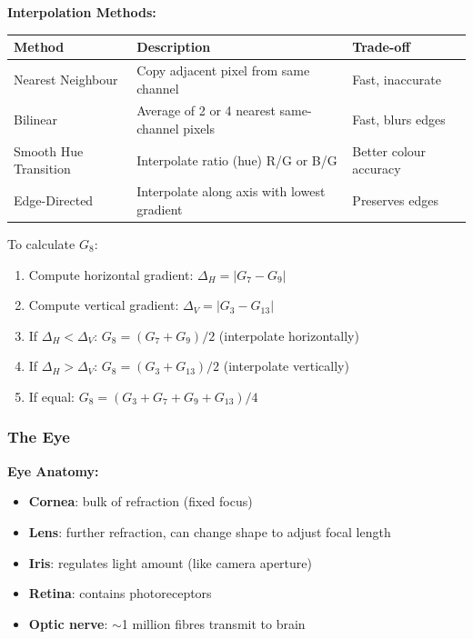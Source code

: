 \textbf{Interpolation Methods:}

\begin{center}
\renewcommand{\arraystretch}{1.3}
\begin{tabular}{@{} l p{5cm} p{4cm} @{}}
\toprule
\textbf{Method} & \textbf{Description} & \textbf{Trade-off} \\
\midrule
Nearest Neighbour & Copy adjacent pixel from same channel & Fast, inaccurate \\
Bilinear & Average of 2 or 4 nearest same-channel pixels & Fast, blurs edges \\
Smooth Hue Transition & Interpolate ratio (hue) R/G or B/G & Better colour accuracy \\
Edge-Directed & Interpolate along axis with lowest gradient & Preserves edges \\
\bottomrule
\end{tabular}
\end{center}

\begin{exbox}
To calculate $G_8$:
\begin{enumerate}
  \item Compute horizontal gradient: $\Delta_H = |G_7 - G_9|$
  \item Compute vertical gradient: $\Delta_V = |G_3 - G_{13}|$
  \item If $\Delta_H < \Delta_V$: $G_8 = (G_7 + G_9)/2$ (interpolate horizontally)
  \item If $\Delta_H > \Delta_V$: $G_8 = (G_3 + G_{13})/2$ (interpolate vertically)
  \item If equal: $G_8 = (G_3 + G_7 + G_9 + G_{13})/4$
\end{enumerate}
\end{exbox}

\bigseparator

\subsubsection{The Eye}

\textbf{Eye Anatomy:}
\begin{itemize}
  \item \textbf{Cornea}: bulk of refraction (fixed focus)
  \item \textbf{Lens}: further refraction, can change shape to adjust focal length
  \item \textbf{Iris}: regulates light amount (like camera aperture)
  \item \textbf{Retina}: contains photoreceptors
  \item \textbf{Optic nerve}: $\sim$1 million fibres transmit to brain
\end{itemize}

